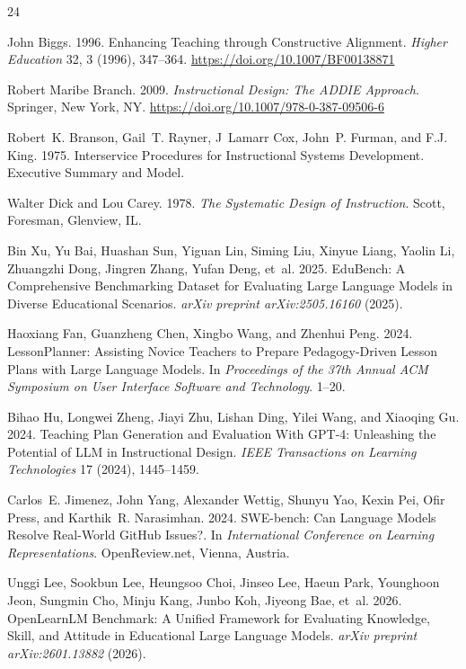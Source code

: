\documentclass[sigconf,preprint]{acmart}
\begin{document}
\begin{thebibliography}{24}

John Biggs. 1996. Enhancing Teaching through Constructive Alignment. \emph{Higher Education} 32, 3 (1996), 347--364. \url{https://doi.org/10.1007/BF00138871}

Robert Maribe Branch. 2009. \emph{Instructional Design: The ADDIE Approach}. Springer, New York, NY. \url{https://doi.org/10.1007/978-0-387-09506-6}

Robert~K. Branson, Gail~T. Rayner, J~Lamarr Cox, John~P. Furman, and F.J. King. 1975. Interservice Procedures for Instructional Systems Development. Executive Summary and Model.

Walter Dick and Lou Carey. 1978. \emph{The Systematic Design of Instruction}. Scott, Foresman, Glenview, IL.

Bin Xu, Yu Bai, Huashan Sun, Yiguan Lin, Siming Liu, Xinyue Liang, Yaolin Li, Zhuangzhi Dong, Jingren Zhang, Yufan Deng, et~al. 2025. EduBench: A Comprehensive Benchmarking Dataset for Evaluating Large Language Models in Diverse Educational Scenarios. \emph{arXiv preprint arXiv:2505.16160} (2025).

Haoxiang Fan, Guanzheng Chen, Xingbo Wang, and Zhenhui Peng. 2024. LessonPlanner: Assisting Novice Teachers to Prepare Pedagogy-Driven Lesson Plans with Large Language Models. In \emph{Proceedings of the 37th Annual ACM Symposium on User Interface Software and Technology}. 1--20.

Bihao Hu, Longwei Zheng, Jiayi Zhu, Lishan Ding, Yilei Wang, and Xiaoqing Gu. 2024. Teaching Plan Generation and Evaluation With GPT-4: Unleashing the Potential of LLM in Instructional Design. \emph{IEEE Transactions on Learning Technologies} 17 (2024), 1445--1459.

Carlos~E. Jimenez, John Yang, Alexander Wettig, Shunyu Yao, Kexin Pei, Ofir Press, and Karthik~R. Narasimhan. 2024. SWE-bench: Can Language Models Resolve Real-World GitHub Issues?. In \emph{International Conference on Learning Representations}. OpenReview.net, Vienna, Austria.

Unggi Lee, Sookbun Lee, Heungsoo Choi, Jinseo Lee, Haeun Park, Younghoon Jeon, Sungmin Cho, Minju Kang, Junbo Koh, Jiyeong Bae, et~al. 2026. OpenLearnLM Benchmark: A Unified Framework for Evaluating Knowledge, Skill, and Attitude in Educational Large Language Models. \emph{arXiv preprint arXiv:2601.13882} (2026).


\end{thebibliography}
\end{document}
